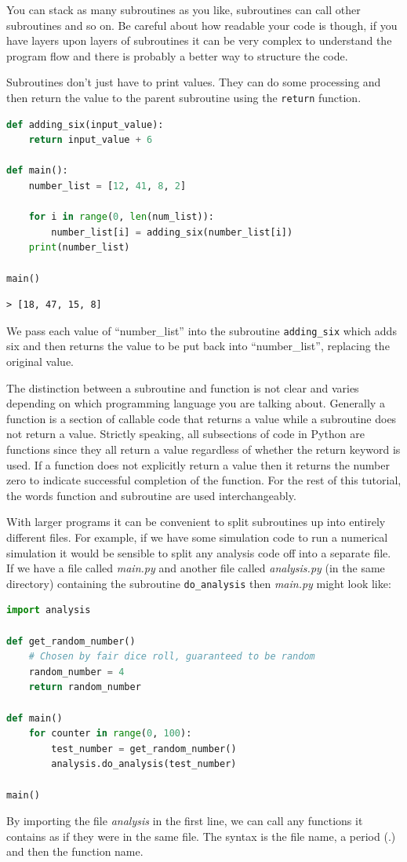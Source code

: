 				You can stack as many subroutines as you like, subroutines can call other subroutines and so on. Be careful about how readable your code is though, if you have layers upon layers of subroutines it can be very complex to understand the program flow and there is probably a better way to structure the code. 

				Subroutines don't just have to print values. They can do some processing and then return the value to the parent subroutine using the \texttt{return} function.
			\begin{minipage}{\linewidth}
			\begin{lstlisting}[language=Python]
def adding_six(input_value):
	return input_value + 6

def main():
	number_list = [12, 41, 8, 2]
	
	for i in range(0, len(num_list)):
		number_list[i] = adding_six(number_list[i])
	print(number_list)
			
main()\end{lstlisting}
\end{minipage}

			\begin{verbatim}> [18, 47, 15, 8]\end{verbatim}
			We pass each value of ``number\_list'' into the subroutine \texttt{adding\_six} which adds six and then returns the value to be put back into ``number\_list'', replacing the original value. 

			The distinction between a subroutine and function is not clear and varies depending on which programming language you are talking about. Generally a function is a section of callable code that returns a value while a subroutine does not return a value. Strictly speaking, all subsections of code in Python are functions since they all return a value regardless of whether the return keyword is used. If a function does not explicitly return a value then it returns the number zero to indicate successful completion of the function. For the rest of this tutorial, the words function and subroutine are used interchangeably.

			With larger programs it can be convenient to split subroutines up into entirely different files. For example, if we have some simulation code to run a numerical simulation it would be sensible to split any analysis code off into a separate file. If we have a file called \textit{main.py} and another file called \textit{analysis.py} (in the same directory) containing the subroutine \texttt{do\_analysis} then \textit{main.py} might look like:
\begin{lstlisting}[language=Python]
import analysis

def get_random_number()
	# Chosen by fair dice roll, guaranteed to be random
	random_number = 4
	return random_number
	
def main()
	for counter in range(0, 100):
		test_number = get_random_number()
		analysis.do_analysis(test_number)
			
main()\end{lstlisting}
By importing the file \textit{analysis} in the first line, we can call any functions it contains as if they were in the same file. The syntax is the file name, a period (.) and then the function name.


